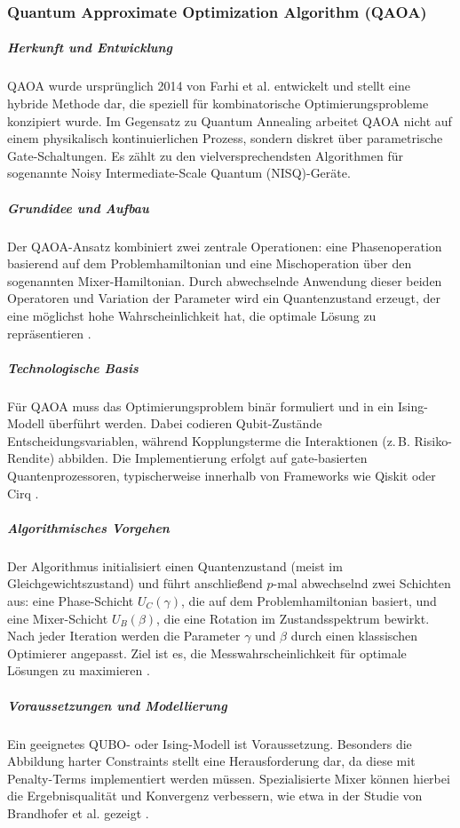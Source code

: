 \subsubsection*{Quantum Approximate Optimization Algorithm (QAOA)}

\subparagraph{Herkunft und Entwicklung}
QAOA wurde ursprünglich 2014 von Farhi et al. entwickelt \cite{farhi_quantum_2014} und stellt eine hybride Methode dar, die speziell für kombinatorische Optimierungsprobleme konzipiert wurde. Im Gegensatz zu Quantum Annealing arbeitet QAOA nicht auf einem physikalisch kontinuierlichen Prozess, sondern diskret über parametrische Gate-Schaltungen. Es zählt zu den vielversprechendsten Algorithmen für sogenannte Noisy Intermediate-Scale Quantum (NISQ)-Geräte.

\subparagraph{Grundidee und Aufbau}
Der QAOA-Ansatz kombiniert zwei zentrale Operationen: eine Phasenoperation basierend auf dem Problemhamiltonian und eine Mischoperation über den sogenannten Mixer-Hamiltonian. Durch abwechselnde Anwendung dieser beiden Operatoren und Variation der Parameter wird ein Quantenzustand erzeugt, der eine möglichst hohe Wahrscheinlichkeit hat, die optimale Lösung zu repräsentieren \cite{brandhofer_benchmarking_2022}.

\subparagraph{Technologische Basis}
Für QAOA muss das Optimierungsproblem binär formuliert und in ein Ising-Modell überführt werden. Dabei codieren Qubit-Zustände Entscheidungsvariablen, während Kopplungsterme die Interaktionen (z.\,B. Risiko-Rendite) abbilden. Die Implementierung erfolgt auf gate-basierten Quantenprozessoren, typischerweise innerhalb von Frameworks wie Qiskit oder Cirq \cite{buonaiuto_best_2023}.

\subparagraph{Algorithmisches Vorgehen}
Der Algorithmus initialisiert einen Quantenzustand (meist im Gleichgewichtszustand) und führt anschließend $p$-mal abwechselnd zwei Schichten aus: eine Phase-Schicht $U_C(\gamma)$, die auf dem Problemhamiltonian basiert, und eine Mixer-Schicht $U_B(\beta)$, die eine Rotation im Zustandsspektrum bewirkt. Nach jeder Iteration werden die Parameter $\gamma$ und $\beta$ durch einen klassischen Optimierer angepasst. Ziel ist es, die Messwahrscheinlichkeit für optimale Lösungen zu maximieren \cite{brandhofer_benchmarking_2022}.

\subparagraph{Voraussetzungen und Modellierung}
Ein geeignetes QUBO- oder Ising-Modell ist Voraussetzung. Besonders die Abbildung harter Constraints stellt eine Herausforderung dar, da diese mit Penalty-Terms implementiert werden müssen. Spezialisierte Mixer können hierbei die Ergebnisqualität und Konvergenz verbessern, wie etwa in der Studie von Brandhofer et al. gezeigt \cite{brandhofer_benchmarking_2022}.

